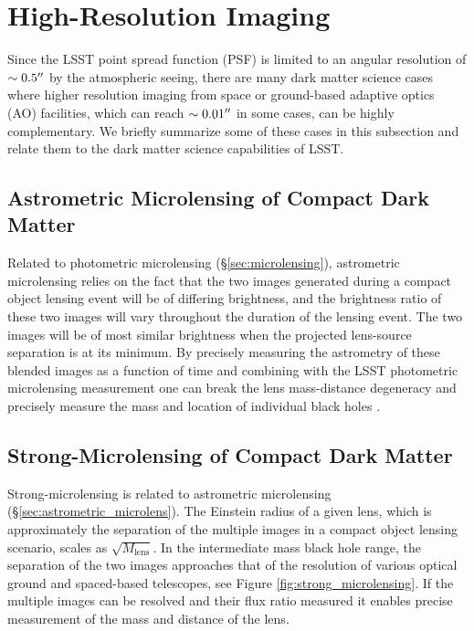 \section{High-Resolution Imaging }
\label{sec:highres}

Since the LSST point spread function (PSF) is limited to an angular resolution of $\sim 0.5''$ by the atmospheric seeing, there are many dark matter science cases where higher resolution imaging from space or ground-based adaptive optics (AO) facilities, which can reach $\sim 0.01''$ in some cases, can be highly complementary. We briefly summarize some of these cases in this subsection and relate them to the dark matter science capabilities of LSST.

\subsection{Astrometric Microlensing of Compact Dark Matter }
\label{sec:astrometric_microlens}
Related to photometric microlensing (\S\ref{sec:microlensing}), astrometric microlensing relies on the fact that the two images generated during a compact object lensing event will be of differing brightness, and the brightness ratio of these two images will vary throughout the duration of the lensing event.
The two images will be of most similar brightness when the projected lens-source separation is at its minimum.
By precisely measuring the astrometry of these blended images as a function of time and combining with the LSST photometric microlensing measurement one can break the lens mass-distance degeneracy and precisely measure the mass and location of individual black holes \citep{2015ApJ...814L..11Y}.

\subsection{Strong-Microlensing of Compact Dark Matter }
Strong-microlensing is related to astrometric microlensing (\S\ref{sec:astrometric_microlens}).
The Einstein radius of a given lens, which is approximately the separation of the multiple images in a compact object lensing scenario, scales as $\sqrt{M_\mathrm{lens}}$.
In the intermediate mass black hole range, the separation of the two images approaches that of the resolution of various optical ground and spaced-based telescopes, see Figure \ref{fig:strong_microlensing}.
If the multiple images can be resolved and their flux ratio measured it enables precise measurement of the mass and distance of the lens.

